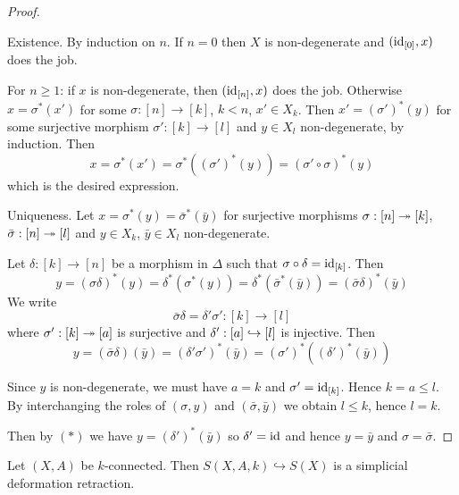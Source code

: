 \begin{proof}\ 

Existence. By induction on $n$. If $n=0$ then $X$ is non-degenerate and $(\operatorname{id}_{[0]},x)$ does the job.

For $n\geq1$: if $x$ is non-degenerate, then $(\operatorname{id}_{[n]},x)$ does the job.
Otherwise $x=\sigma^*(x')$ for some $\sigma:[n]\to [k]$, $k<n$, $x'\in X_k$.
Then $x'=(\sigma')^*(y)$ for some surjective morphism $\sigma':[k]\to[l]$ and $y\in X_l$ non-degenerate, by induction. Then \[x=\sigma^*(x')=\sigma^*((\sigma')^*(y))=(\sigma'\circ\sigma)^*(y)\] which is the desired expression.

Uniqueness. Let $x=\sigma^*(y)=\bar{\sigma}^*(\bar y)$ for surjective morphisms $\sigma:[n]\twoheadrightarrow[k]$, $\bar{\sigma}:[n]\twoheadrightarrow[l]$ and $y\in X_k$, $\bar y \in X_l$ non-degenerate.

Let $\delta:[k]\to[n]$ be a morphism in $\Delta$ such that $\sigma\circ\delta=\operatorname{id}_{[k]}$.
Then
\[y=(\sigma\delta)^*(y)=\delta^*(\sigma^*(y))=\delta^*(\bar{\sigma}^*(\bar{y}))=(\bar{\sigma}\delta)^*(\bar{y})\]
We write
\[\bar{\sigma}\delta=\delta'\sigma': [k]\to[l]\]
where $\sigma':[k]\twoheadrightarrow[a]$ is surjective and $\delta':[a]\hookrightarrow[l]$ is injective. Then \[y=(\bar\sigma\delta)(\bar y)=(\delta'\sigma')^*(\bar y)=(\sigma')^*((\delta')^*(\bar{y}))\tag{$*$}\]

Since $y$ is non-degenerate, we must have $a=k$ and $\sigma'=\operatorname{id}_{[k]}$. Hence $k=a\leq l$. By interchanging the roles of $(\sigma,y)$ and $(\bar{\sigma},\bar{y})$ we obtain $l\leq k$, hence $l=k$.

Then by $(*)$ we have $y=(\delta')^*(\bar{y})$ so $\delta'=\operatorname{id}$ and hence $y=\bar{y}$ and $\sigma=\bar{\sigma}$.
\end{proof}

\begin{theorem}\label{sx-def-r}
Let $(X,A)$ be $k$-connected. Then $S(X,A,k)\hookrightarrow S(X)$ is a simplicial deformation retraction.
\end{theorem}

